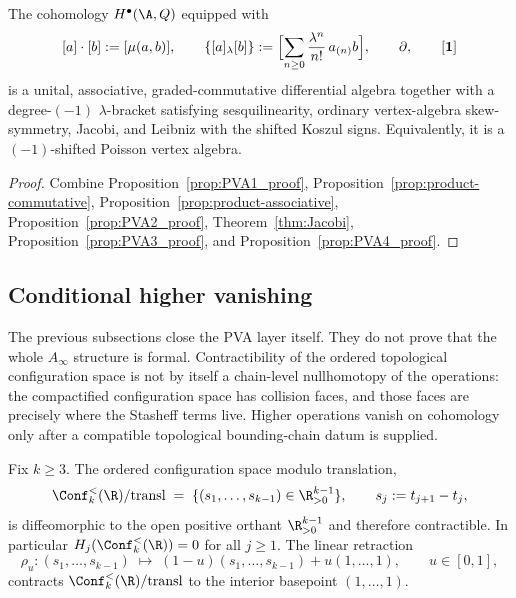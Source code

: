 \begin{corollary}
\label{cor:PVA-structure}
The cohomology $H^\bullet(\A,Q)$ equipped with
\[
[a]\cdot[b]:=[\mu(a,b)],
\qquad
\{[a]_\lambda[b]\}:=\Bigl[\sum_{n\ge0}\frac{\lambda^n}{n!}\,a_{(n)}b\Bigr],
\qquad
\partial,
\qquad
[\mathbf 1]
\]
is a unital, associative, graded-commutative differential algebra together with a
degree-$(-1)$ $\lambda$-bracket satisfying sesquilinearity, ordinary
vertex-algebra skew-symmetry, Jacobi, and Leibniz with the shifted
Koszul signs. Equivalently, it is a $(-1)$-shifted Poisson vertex algebra.
\end{corollary}

\begin{proof}
Combine Proposition~\ref{prop:PVA1_proof},
Proposition~\ref{prop:product-commutative},
Proposition~\ref{prop:product-associative},
Proposition~\ref{prop:PVA2_proof},
Theorem~\ref{thm:Jacobi},
Proposition~\ref{prop:PVA3_proof},
and Proposition~\ref{prop:PVA4_proof}.
\end{proof}

\subsection{Conditional higher vanishing}

The previous subsections close the PVA layer itself. They do not
prove that the whole $A_\infty$ structure is formal. Contractibility
of the ordered topological configuration space is not by itself a
chain-level nullhomotopy of the operations: the compactified
configuration space has collision faces, and those faces are precisely
where the Stasheff terms live. Higher operations vanish on cohomology
only after a compatible topological bounding-chain datum is supplied.

\begin{lemma}
\label{lem:topological-contraction}
Fix $k\ge3$. The ordered configuration space modulo translation,
\[
\Conf_k^{<}(\R)/\mathrm{transl}
\;=\;
\{(s_1,\ldots,s_{k-1})\in\R^{k-1}_{>0}\},
\qquad
s_j:=t_{j+1}-t_j,
\]
is diffeomorphic to the open positive orthant $\R^{k-1}_{>0}$ and therefore contractible.
In particular $H_j(\Conf_k^{<}(\R))=0$ for all $j\ge1$. The linear retraction
\begin{equation}
\label{eq:affine-retraction}
\rho_u\colon (s_1,\ldots,s_{k-1})\;\longmapsto\;
(1-u)(s_1,\ldots,s_{k-1})+u(1,\ldots,1),
\qquad u\in[0,1],
\end{equation}
contracts $\Conf_k^{<}(\R)/\mathrm{transl}$ to the interior basepoint
$(1,\ldots,1)$.
\end{lemma}

